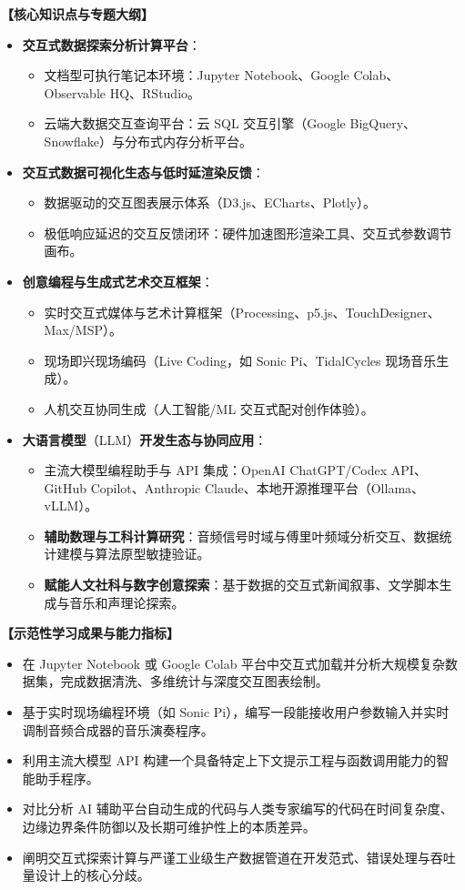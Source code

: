 \textbf{【核心知识点与专题大纲】}
\begin{itemize}
    \item \textbf{交互式数据探索分析计算平台}：
    \begin{itemize}
        \item 文档型可执行笔记本环境：Jupyter Notebook、Google Colab、Observable HQ、RStudio。
        \item 云端大数据交互查询平台：云 SQL 交互引擎（Google BigQuery、Snowflake）与分布式内存分析平台。
    \end{itemize}
    \item \textbf{交互式数据可视化生态与低时延渲染反馈}：
    \begin{itemize}
        \item 数据驱动的交互图表展示体系（D3.js、ECharts、Plotly）。
        \item 极低响应延迟的交互反馈闭环：硬件加速图形渲染工具、交互式参数调节画布。
    \end{itemize}
    \item \textbf{创意编程与生成式艺术交互框架}：
    \begin{itemize}
        \item 实时交互式媒体与艺术计算框架（Processing、p5.js、TouchDesigner、Max/MSP）。
        \item 现场即兴现场编码（Live Coding，如 Sonic Pi、TidalCycles 现场音乐生成）。
        \item 人机交互协同生成（人工智能/ML 交互式配对创作体验）。
    \end{itemize}
    \item \textbf{大语言模型}（LLM）\textbf{开发生态与协同应用}：
    \begin{itemize}
        \item 主流大模型编程助手与 API 集成：OpenAI ChatGPT/Codex API、GitHub Copilot、Anthropic Claude、本地开源推理平台（Ollama、vLLM）。
        \item \textbf{辅助数理与工科计算研究}：音频信号时域与傅里叶频域分析交互、数据统计建模与算法原型敏捷验证。
        \item \textbf{赋能人文社科与数字创意探索}：基于数据的交互式新闻叙事、文学脚本生成与音乐和声理论探索。
    \end{itemize}
\end{itemize}

\textbf{【示范性学习成果与能力指标】}
\begin{itemize}
    \item 在 Jupyter Notebook 或 Google Colab 平台中交互式加载并分析大规模复杂数据集，完成数据清洗、多维统计与深度交互图表绘制。
    \item 基于实时现场编程环境（如 Sonic Pi），编写一段能接收用户参数输入并实时调制音频合成器的音乐演奏程序。
    \item 利用主流大模型 API 构建一个具备特定上下文提示工程与函数调用能力的智能助手程序。
    \item 对比分析 AI 辅助平台自动生成的代码与人类专家编写的代码在时间复杂度、边缘边界条件防御以及长期可维护性上的本质差异。
    \item 阐明交互式探索计算与严谨工业级生产数据管道在开发范式、错误处理与吞吐量设计上的核心分歧。
\end{itemize}

